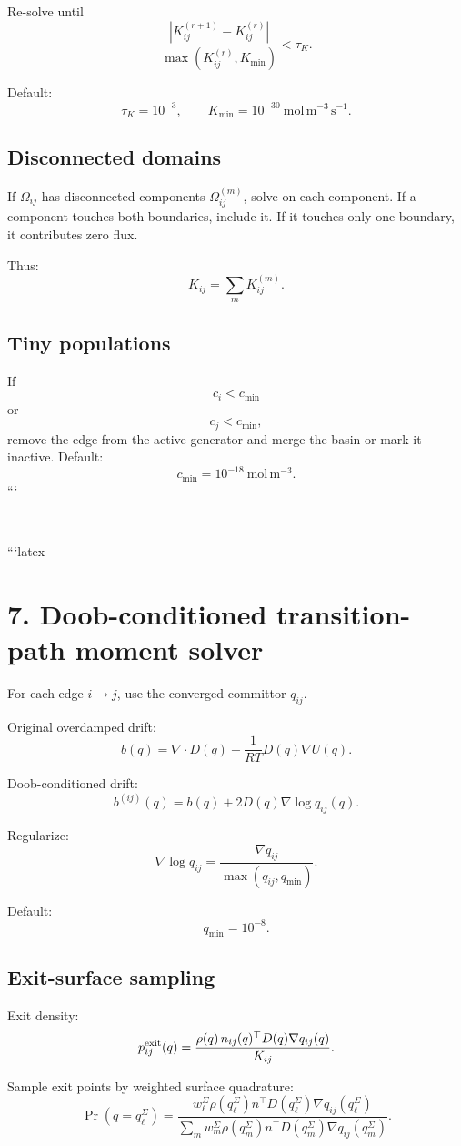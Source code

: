 Re-solve until
\[
\frac{|K_{ij}^{(r+1)}-K_{ij}^{(r)}|}
{\max(K_{ij}^{(r)},K_{\min})}
<
\tau_K.
\]

Default:
\[
\tau_K=10^{-3},
\qquad
K_{\min}=10^{-30}\ \mathrm{mol\,m^{-3}\,s^{-1}}.
\]

\subsection{Disconnected domains}

If \(\Omega_{ij}\) has disconnected components \(\Omega_{ij}^{(m)}\), solve
on each component. If a component touches both boundaries, include it. If it
touches only one boundary, it contributes zero flux.

Thus:
\[
K_{ij}=\sum_mK_{ij}^{(m)}.
\]

\subsection{Tiny populations}

If
\[
c_i<c_{\min}
\]
or
\[
c_j<c_{\min},
\]
remove the edge from the active generator and merge the basin or mark it inactive.
Default:
\[
c_{\min}=10^{-18}\ \mathrm{mol\,m^{-3}}.
\]
```

---

```latex
\section{7. Doob-conditioned transition-path moment solver}

For each edge \(i\to j\), use the converged committor \(q_{ij}\).

Original overdamped drift:
\[
b(q)=
\nabla\cdot D(q)
-
\frac{1}{RT}D(q)\nabla U(q).
\]

Doob-conditioned drift:
\[
b^{(ij)}(q)
=
b(q)
+
2D(q)\nabla\log q_{ij}(q).
\]

Regularize:
\[
\nabla\log q_{ij}
=
\frac{\nabla q_{ij}}{\max(q_{ij},q_{\min})}.
\]

Default:
\[
q_{\min}=10^{-8}.
\]

\subsection{Exit-surface sampling}

Exit density:
\[
p_{ij}^{\rm exit}(q)
=
\frac{
\rho(q)\,n_{ij}(q)^\top D(q)\nabla q_{ij}(q)
}{
K_{ij}
}.
\]

Sample exit points by weighted surface quadrature:
\[
\Pr(q=q_\ell^\Sigma)
=
\frac{
w_\ell^\Sigma\rho(q_\ell^\Sigma)n^\top D(q_\ell^\Sigma)\nabla q_{ij}(q_\ell^\Sigma)
}{
\sum_m
w_m^\Sigma\rho(q_m^\Sigma)n^\top D(q_m^\Sigma)\nabla q_{ij}(q_m^\Sigma)
}.
\]

